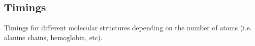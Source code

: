 % 





\subsection{Timings}
Timings for different molecular structures depending on the number of atoms (i.e. alanine chains, hemoglobin, etc).
